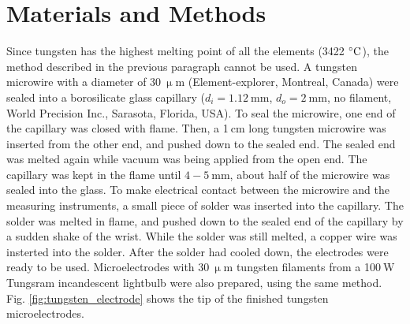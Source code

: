\documentclass[manuscript=article, journal=jceda8]{achemso}
\begin{document}
\section{Materials and Methods}

Since tungsten has the highest melting point of all the elements (3422 $\celsius$), the method described in the previous paragraph cannot be used.
A tungsten microwire with a diameter of $30~\upmu$m (Element-explorer, Montreal, Canada) were sealed into a borosilicate glass capillary ($d_i=1.12~$mm, $d_o=2~$mm, no filament, World Precision Inc., Sarasota, Florida, USA).
To seal the microwire, one end of the capillary was closed with flame.
Then, a 1$~$cm long tungsten microwire was inserted from the other end, and pushed down to the sealed end.
The sealed end was melted again while vacuum was being applied from the open end.
The capillary was kept in the flame until $4-5~$mm, about half of the microwire was sealed into the glass.
To make electrical contact between the microwire and the measuring instruments, a small piece of solder was inserted into the capillary.
The solder was melted in flame, and pushed down to the sealed end of the capillary by a sudden shake of the wrist.
While the solder was still melted, a copper wire was insterted into the solder.
After the solder had cooled down, the electrodes were ready to be used.
Microelectrodes with $30~\upmu$m tungsten filaments from a 100$~$W Tungsram incandescent lightbulb were also prepared, using the same method.
Fig. \ref{fig:tungsten_electrode} shows the tip of the finished tungsten microelectrodes.
\end{document}
